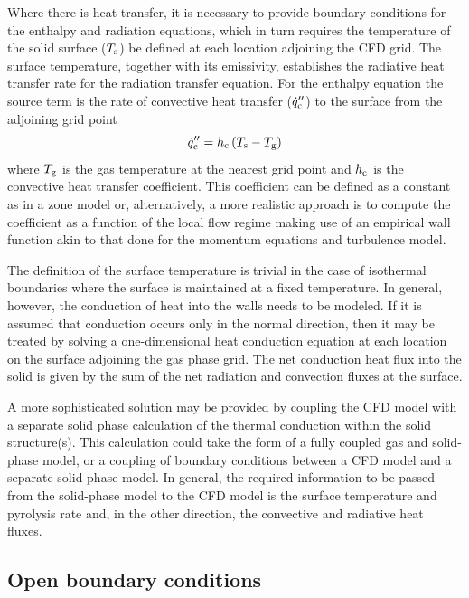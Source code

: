 \documentclass[graybox]{svmult}
\begin{document}
Where there is heat transfer, it is necessary to provide boundary conditions for the enthalpy and radiation equations, which in turn requires the temperature of the solid surface ($T_{\rm s}$) be defined at each location adjoining the CFD grid. The surface temperature, together with its emissivity, establishes the radiative heat transfer rate for the radiation transfer equation. For the enthalpy equation the source term is the rate of convective heat transfer ($\dot{q}_{\rm c}''$) to the surface from the adjoining grid point
\begin{equation}
\dot{q}_{\rm c}'' = h_{\rm c} \, (T_{\rm s}-T_{\rm g})
\label{eq:convection}
\end{equation}
where $T_{\rm g}$ is the gas temperature at the nearest grid point and $h_{\rm c}$ is the convective heat transfer coefficient. This coefficient can be defined as a constant as in a zone model or, alternatively, a more realistic approach is to compute the coefficient as a function of the local flow regime making use of an empirical wall function akin to that done for the momentum equations and turbulence model.

The definition of the surface temperature is trivial in the case of isothermal boundaries where the surface is maintained at a fixed temperature. In general, however, the conduction of heat into the walls needs to be modeled. If it is assumed that conduction occurs only in the normal direction, then it may be treated by solving a one-dimensional heat conduction equation at each location on the surface adjoining the gas phase grid. The net conduction heat flux into the solid is given by the sum of the net radiation and convection fluxes at the surface.

A more sophisticated solution may be provided by coupling the CFD model with a separate solid phase calculation of the thermal conduction within the solid structure(s). This calculation could take the form of a fully coupled gas and solid-phase model, or a coupling of boundary conditions between a CFD model and a separate solid-phase model. In general, the required information to be passed from the solid-phase model to the CFD model is the surface temperature and pyrolysis rate and, in the other direction, the convective and radiative heat fluxes.

\subsection{Open boundary conditions}
\end{document}
